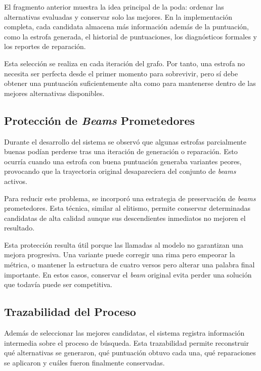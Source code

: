\documentclass[12pt,a4paper,twoside,openright]{book}
\begin{document}
El fragmento anterior muestra la idea principal de la poda: ordenar las alternativas evaluadas y conservar solo las mejores. En la implementación completa, cada candidata almacena más información además de la puntuación,
como la estrofa generada, el historial de puntuaciones, los diagnósticos formales y los reportes de reparación.

Esta selección se realiza en cada iteración del grafo. Por tanto, una estrofa no necesita ser perfecta desde el primer momento para sobrevivir, pero sí debe obtener una puntuación suficientemente alta como para mantenerse dentro de las mejores alternativas disponibles.


\subsection{Protección de \emph{Beams} Prometedores}

Durante el desarrollo del sistema se observó que algunas estrofas parcialmente buenas podían perderse tras una iteración de generación o reparación. Esto ocurría cuando una estrofa con buena puntuación generaba variantes peores,
provocando que la trayectoria original desapareciera del conjunto de \emph{beams} activos.

Para reducir este problema, se incorporó una estrategia de preservación de \emph{beams} prometedores. Esta técnica, similar al elitismo, permite conservar determinadas candidatas de alta calidad aunque sus descendientes inmediatos no mejoren el resultado.

Esta protección resulta útil porque las llamadas al modelo no garantizan una mejora progresiva. Una variante puede corregir una rima pero empeorar la métrica, o mantener la estructura de cuatro versos pero alterar una palabra final importante.
En estos casos, conservar el \emph{beam} original evita perder una solución que todavía puede ser competitiva.


\subsection{Trazabilidad del Proceso}

Además de seleccionar las mejores candidatas, el sistema registra información intermedia sobre el proceso de búsqueda. Esta trazabilidad permite reconstruir qué alternativas se generaron, qué puntuación obtuvo cada una,
qué reparaciones se aplicaron y cuáles fueron finalmente conservadas.

\end{document}
